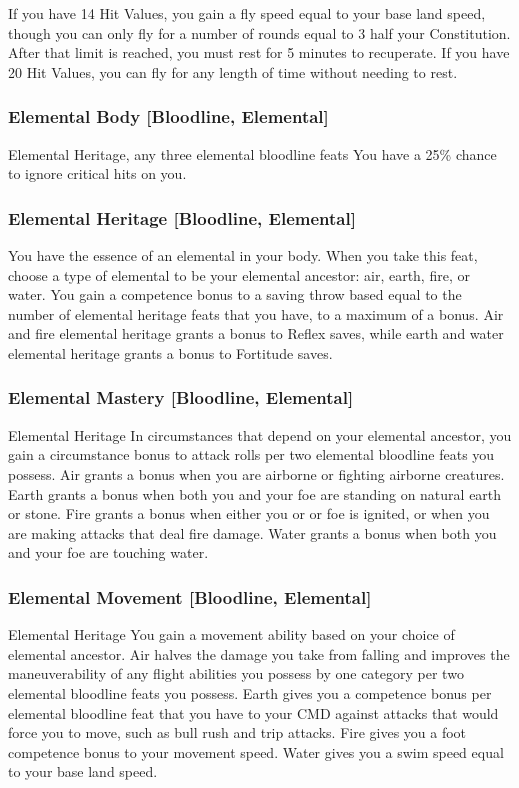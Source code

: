 If you have 14 Hit Values, you gain a fly speed equal to your base land speed, though you can only fly for a number of rounds equal to 3 \add half your Constitution. After that limit is reached, you must rest for 5 minutes to recuperate. If you have 20 Hit Values, you can fly for any length of time without needing to rest.

\subsubsection{Elemental Body [Bloodline, Elemental]}
\featpre Elemental Heritage, any three elemental bloodline feats
\featben You have a 25\% chance to ignore critical hits on you.

\subsubsection{Elemental Heritage [Bloodline, Elemental]}
\featben You have the essence of an elemental in your body. When you take this feat, choose a type of elemental to be your elemental ancestor: air, earth, fire, or water. You gain a competence bonus to a saving throw based equal to the number of elemental heritage feats that you have, to a maximum of a  bonus. Air and fire elemental heritage grants a bonus to Reflex saves, while earth and water elemental heritage grants a bonus to Fortitude saves.

\subsubsection{Elemental Mastery [Bloodline, Elemental]}
\featpre Elemental Heritage
\featben In circumstances that depend on your elemental ancestor, you gain a  circumstance bonus to attack rolls per two elemental bloodline feats you possess. Air grants a bonus when you are airborne or fighting airborne creatures. Earth grants a bonus when both you and your foe are standing on natural earth or stone. Fire grants a bonus when either you or or foe is ignited, or when you are making attacks that deal fire damage. Water grants a bonus when both you and your foe are touching water.

\subsubsection{Elemental Movement [Bloodline, Elemental]}
\featpre Elemental Heritage
\featben You gain a movement ability based on your choice of elemental ancestor. Air halves the damage you take from falling and improves the maneuverability of any flight abilities you possess by one category per two elemental bloodline feats you possess. Earth gives you a  competence bonus per elemental bloodline feat that you have to your CMD against attacks that would force you to move, such as bull rush and trip attacks. Fire gives you a  foot competence bonus to your movement speed. Water gives you a swim speed equal to your base land speed.



